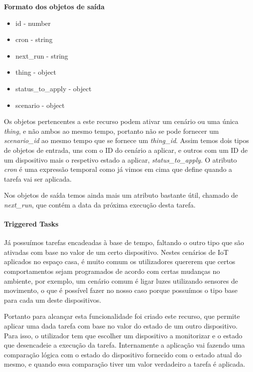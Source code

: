 \textbf{Formato dos objetos de saída}
\begin{itemize}
    \item id - number
    \item cron - string
    \item next{\_}run - string
    \item thing - object
    \item status{\_}to{\_}apply - object
    \item scenario - object
\end{itemize}

Os objetos pertencentes a este recurso podem ativar um cenário ou uma única \textit{thing}, e não ambos ao mesmo tempo, portanto não se pode fornecer um \textit{scenario{\_}id} ao mesmo tempo que se fornece um \textit{thing{\_}id}. Assim temos dois tipos de objetos de entrada, uns com o ID do cenário a aplicar, e outros com um ID de um dispositivo mais o respetivo estado a aplicar, \textit{status{\_}to{\_}apply}. O atributo \textit{cron} é uma expressão temporal como já vimos em cima que define quando a tarefa vai ser aplicada.

Nos objetos de saída temos ainda mais um atributo bastante útil, chamado de \textit{next{\_}run}, que contém a data da próxima execução desta tarefa.

\paragraph*{Triggered Tasks}

Já possuímos tarefas encadeadas à base de tempo, faltando o outro tipo que são ativadas com base no valor de um certo dispositivo. Nestes cenários de IoT aplicados no espaço casa, é muito comum os utilizadores quererem que certos comportamentos sejam programados de acordo com certas mudanças no ambiente, por exemplo, um cenário comum é ligar luzes utilizando sensores de movimento, o que é possível fazer no nosso caso porque possuímos o tipo base para cada um deste dispositivos.

Portanto para alcançar esta funcionalidade foi criado este recurso, que permite aplicar uma dada tarefa com base no valor do estado de um outro dispositivo. Para isso, o utilizador tem que escolher um dispositivo a monitorizar e o estado que desencadeie a execução da tarefa. Internamente a aplicação vai fazendo uma comparação lógica com o estado do dispositivo fornecido com o estado atual do mesmo, e quando essa comparação tiver um valor verdadeiro a tarefa é aplicada.

